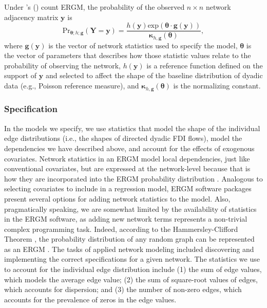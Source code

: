 \documentclass[reqno,onecolumn,letterpaper,12pt]{article}
\newcommand\citeapos[1]{\citeauthor{#1}'s (\citeyear{#1})}
\begin{document}
Under \citeapos{krivitsky2012exponential} count ERGM, the probability of the observed $n \times n$ network adjacency matrix $\bm{y}$ is
\begin{equation}
 \text{Pr}_{\bm{\theta};h;\bm{g}}( \bm{Y}=\bm{y} )=\frac{ h(\bm{y})\text{exp}( \bm {\theta} \cdot \bm{g} (\bm{y}) )}{\bm{\kappa}_{h,\bm{g}}(\bm{\theta})},
 \end{equation}
 where $\bm{g}( \bm{y} )$ is the vector of network statistics used to specify the model, $\bm{\theta}$ is the vector of parameters that describes how those statistic values relate to the probability of observing the network, $h(\bm{y})$ is a reference function defined on the support of $\bm{y}$ and selected to affect the shape of the baseline distribution of dyadic data (e.g., Poisson reference measure), and $\bm{\kappa}_{h,\bm{g}}(\bm{\theta})$ is the normalizing constant.



\subsubsection{Specification}


In the models we specify, we use statistics that model the shape of the individual edge distributions (i.e., the shapes of directed dyadic FDI flows), model the dependencies we have described above, and account for the effects of exogenous covariates. Network statistics in an ERGM model local dependencies, just like conventional covariates, but are expressed at the network-level because that is how they are incorporated into the ERGM probability distribution \citep{desmarais2012micro}. Analogous to selecting covariates to include in a regression model, ERGM software packages present several options for adding network statistics to the model.  Also, pragmatically speaking, we are somewhat limited by the availability of statistics in the ERGM software, as adding new network terms represents a non-trivial complex programming task.  Indeed, according to the Hammersley-Clifford Theorem \citep{hammersley1971markov}, the probability distribution of any random graph can be represented as an ERGM \citep{yang2014estimation}. The tasks of applied network modeling included discovering and implementing the correct specifications for a given network. The statistics we use to account for the individual edge distribution include (1) the sum of edge values, which models the average edge value; (2) the sum of square-root values of edges, which accounts for dispersion; and (3) the number of non-zero edges, which accounts for the prevalence of zeros in the edge values.
\end{document}

